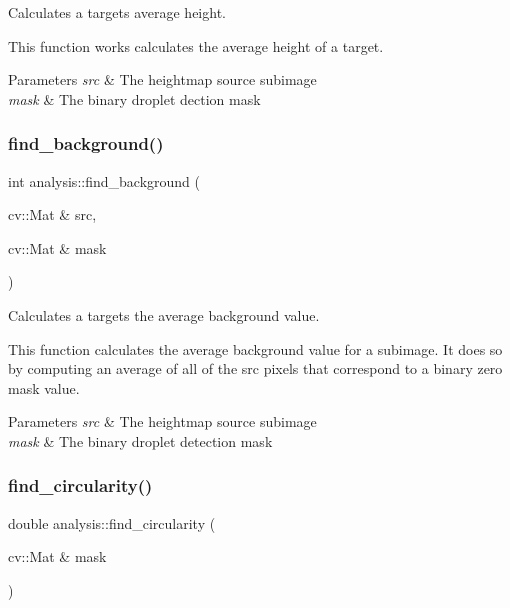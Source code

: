 Calculates a target\textquotesingle{}s average height. 

This function works calculates the average height of a target.


\begin{DoxyParams}{Parameters}
{\em src} & The heightmap source subimage \\
\hline
{\em mask} & The binary droplet dection mask \\
\hline
\end{DoxyParams}
\mbox{\label{namespaceanalysis_a6f9bf7edf5878b407c133ddbd89f7af8}} 
\subsubsection{\texorpdfstring{find\+\_\+background()}{find\_background()}}
{\footnotesize\ttfamily int analysis\+::find\+\_\+background (\begin{DoxyParamCaption}\item[{cv\+::\+Mat \&}]{src,  }\item[{cv\+::\+Mat \&}]{mask }\end{DoxyParamCaption})}



Calculates a target\textquotesingle{}s the average background value. 

This function calculates the average background value for a subimage. It does so by computing an average of all of the src pixels that correspond to a binary zero mask value.


\begin{DoxyParams}{Parameters}
{\em src} & The heightmap source subimage \\
\hline
{\em mask} & The binary droplet detection mask \\
\hline
\end{DoxyParams}
\mbox{\label{namespaceanalysis_a6eb28fd6cbc5314e98708ce6a43f457f}} 
\subsubsection{\texorpdfstring{find\+\_\+circularity()}{find\_circularity()}}
{\footnotesize\ttfamily double analysis\+::find\+\_\+circularity (\begin{DoxyParamCaption}\item[{cv\+::\+Mat \&}]{mask }\end{DoxyParamCaption})}

